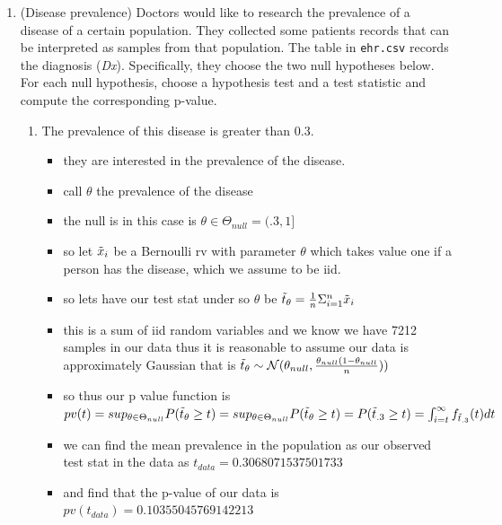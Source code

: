 \documentclass[12pt,twoside]{article}
\begin{document}
\begin{enumerate}
\item (Disease prevalence)
Doctors would like to research the prevalence of a disease of a certain population. They collected some patients records that can be interpreted as samples from that population. The table in \texttt{ehr.csv} records the diagnosis (\textit{Dx}). Specifically, they choose the two null hypotheses below. For each null hypothesis, choose a hypothesis test and a test statistic and compute the corresponding p-value. 
\begin{enumerate}
\item The prevalence of this disease is greater than 0.3.
\begin{itemize}
    \color{blue}
    \item they are interested in the prevalence of the disease.
    \item call $\theta$ the prevalence of the disease 
    \item the null is in this case is $\theta\in \Theta_{null}=(.3,1]$
    \item so let $\Tilde{x}_i$ be a Bernoulli rv with parameter $\theta$ which takes value one if a person has the disease, which we assume to be iid. 
    \item so lets have our test stat under so $\theta$ be $\Tilde{t}_{\theta}=\frac{1}{n}\Sigma_{i=1}^{n}\Tilde{x}_i$
    \item this is a sum of iid random variables and we know we have 7212 samples in our data thus it is reasonable to assume our data is approximately Gaussian that is $\Tilde{t}_{\theta}\sim \mathcal{N}(\theta_{null}, \frac{\theta_{null}(1-\theta_{null}}{n}))$
    \item so thus our p value function is $pv(t)=sup_{\theta\in \Theta_{null}}P(\Tilde{t}_{\theta}\geq t)=sup_{\theta\in \Theta_{null}}P(\Tilde{t}_{\theta}\geq t)=P(\Tilde{t}_{.3}\geq t)=\int_{i=t}^{\infty}f_{\Tilde{t}_{.3}}(t)dt$ 
    \item we can find the mean prevalence in the population as our observed test stat in the data as $t_{data}=0.3068071537501733$
    \item and find that the p-value of our data is $pv(t_{data})=0.10355045769142213$
\end{itemize}



\end{enumerate}
\end{enumerate}
\end{document}
